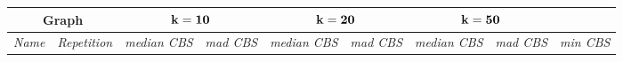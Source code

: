 \documentclass{scrartcl}
\theoremstyle{plain}
\newcommand{\cbs}{CBS}
\begin{document}
\begin{table}[!ht]
	\centering
	\scriptsize
	\begin{tabular}{|lr|rr|rr|rr|r|}
	\hline
\multicolumn{2}{|c|}{\textbf{Graph}}  & 
\multicolumn{2}{c|}{$\bf{k=10}$} & \multicolumn{2}{c|}{$\bf{k=20}$} &  
\multicolumn{2}{c|}{$\bf{k=50}$} & \\ \hline	

\multicolumn{1}{|c}{\emph{Name}} & \multicolumn{1}{c|}{\emph{Repetition}} &
\multicolumn{1}{c}{\emph{median \cbs{}}} & \multicolumn{1}{c|}{\emph{mad 
\cbs{}}} &
\multicolumn{1}{c}{\emph{median \cbs{}}} & \multicolumn{1}{c|}{\emph{mad 
\cbs{}}} &
\multicolumn{1}{c}{\emph{median \cbs{}}} & \multicolumn{1}{c|}{\emph{mad 
\cbs{}}} &
\multicolumn{1}{|c|}{\emph{min \cbs{}}}

\\ \hline


\end{tabular}
\end{table}
\end{document}
